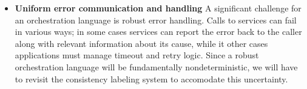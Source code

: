 \begin{itemize}
\item \textbf{Uniform error communication and handling}
A significant challenge for an orchestration language is robust error handling.
Calls to services can fail in various ways; in some cases services can report the error
back to the caller along with relevant information about its cause, while it other cases
applications must manage timeout and retry logic.  Since a robust orchestration language will
be fundamentally nondeterministic, we will have to revisit the consistency labeling system to
accomodate this uncertainty.

\end{itemize}

